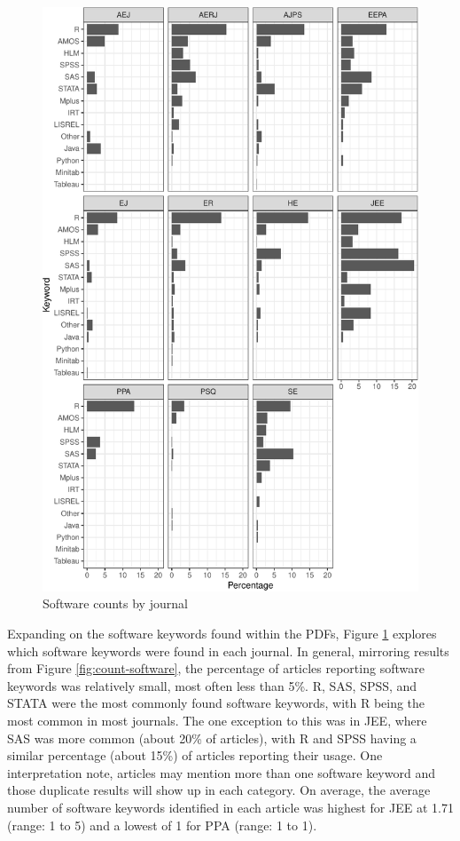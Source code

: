 \documentclass[english,,man]{apa6}
\begin{document}
\begin{figure}
\centering
\includegraphics{software_files/figure-latex/software-journal-1.pdf}
\caption{\label{fig:software-journal}Software counts by journal}
\end{figure}

Expanding on the software keywords found within the PDFs, Figure \ref{fig:software-journal} explores which software keywords were found in each journal. In general, mirroring results from Figure \ref{fig:count-software}, the percentage of articles reporting software keywords was relatively small, most often less than 5\%. R, SAS, SPSS, and STATA were the most commonly found software keywords, with R being the most common in most journals. The one exception to this was in JEE, where SAS was more common (about 20\% of articles), with R and SPSS having a similar percentage (about 15\%) of articles reporting their usage. One interpretation note, articles may mention more than one software keyword and those duplicate results will show up in each category. On average, the average number of software keywords identified in each article was highest for JEE at 1.71 (range: 1 to 5) and a lowest of 1 for PPA (range: 1 to 1).
\end{document}
